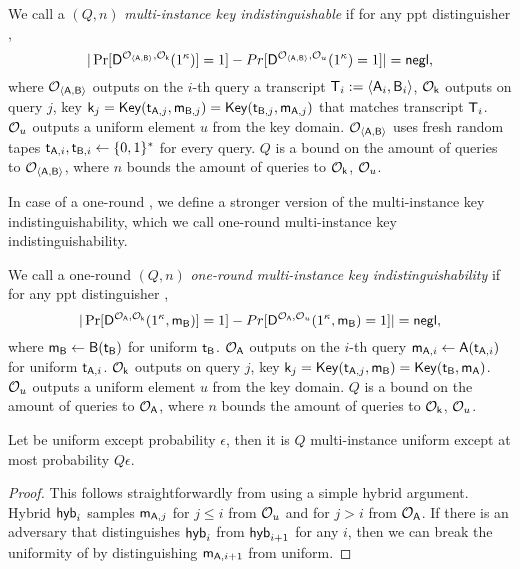 \begin{definition}
We call a \UKA $(Q,n)$ \emph{multi-instance key indistinguishable} if for any ppt distinguisher \D,
$$
|\Pr[\mathsf D^{\mathcal{O}_{\langle \mathsf{A},\mathsf{B}\rangle}, \mathcal{O}_{\mathsf{k}}}(1^{\kappa})]=1]-Pr[\mathsf D^{\mathcal{O}_{\langle \mathsf{A},\mathsf{B}\rangle},\mathcal{O}_{u}}(1^{\kappa})=1]|=\mathsf{negl},
$$
where $\mathcal{O}_{\langle \mathsf{A},\mathsf{B}\rangle}$ outputs on the $i$-th query a transcript $\mathsf{T}_i:=\langle \mathsf{A}_i,\mathsf{B}_i\rangle$, $\mathcal{O}_{\mathsf{k}}$ outputs on query $j$, key $\mathsf{k}_j=\mathsf{Key}(\mathsf{t}_{\mathsf{A},j},\mathsf{m}_{\mathsf{B},j})=\mathsf{Key}(\mathsf{t}_{\mathsf{B},j},\mathsf{m}_{\mathsf{A},j})$ that matches transcript $\mathsf{T}_i$. $\mathcal{O}_u$ outputs a uniform element $u$ from the key domain. $\mathcal{O}_{\langle \mathsf{A},\mathsf{B}\rangle}$ uses fresh random tapes $\mathsf{t}_{\mathsf{A},i},\mathsf{t}_{\mathsf{B},i}\leftarrow\{0,1\}^*$ for every query. $Q$ is a bound on the amount of queries to $\mathcal{O}_{\langle \mathsf{A},\mathsf{B}\rangle}$, where $n$ bounds the amount of queries to $\mathcal{O}_{\mathsf{k}}$, $\mathcal{O}_{u}$. 
\end{definition}

In case of a one-round \UKA, we define a stronger version of the multi-instance key indistinguishability, which we call one-round multi-instance key indistinguishability.

\begin{definition}
We call a one-round \UKA $(Q,n)$ \emph{one-round multi-instance key indistinguishability} if for any ppt distinguisher \D,
$$
|\Pr[\mathsf D^{\mathcal{O}_{\mathsf{A}}, \mathcal{O}_{\mathsf{k}}}(1^{\kappa},\mathsf{m}_\mathsf{B})]=1]-Pr[\mathsf D^{\mathcal{O}_{\mathsf{A}},\mathcal{O}_{u}}(1^{\kappa},\mathsf{m}_\mathsf{B})=1]|=\mathsf{negl},
$$
where $\mathsf{m}_{\mathsf{B}}\leftarrow\mathsf{B}(\mathsf{t}_{\mathsf{B}})$ for uniform $\mathsf{t}_{\mathsf{B}}$. $\mathcal{O}_{\mathsf{A}}$ outputs on the $i$-th query $\mathsf{m}_{\mathsf{A},i}\leftarrow \mathsf{A}(\mathsf{t}_{\mathsf{A},i})$ for uniform $\mathsf{t}_{\mathsf{A},i}$. $\mathcal{O}_{\mathsf{k}}$ outputs on query $j$, key $\mathsf{k}_j=\mathsf{Key}(\mathsf{t}_{\mathsf{A},j},\mathsf{m}_{\mathsf{B}})=\mathsf{Key}(\mathsf{t}_{\mathsf{B}},\mathsf{m}_{\mathsf{A}})$. $\mathcal{O}_u$ outputs a uniform element $u$ from the key domain. $Q$ is a bound on the amount of queries to $\mathcal{O}_{\mathsf{A}}$, where $n$ bounds the amount of queries to $\mathcal{O}_{\mathsf{k}}$, $\mathcal{O}_{u}$. 
\end{definition}

 
\begin{lemma}\label{lem:multuniform}
Let \UKA be uniform except probability $\epsilon$, then it is $Q$ multi-instance uniform except at most probability $Q\epsilon$.
\end{lemma}
\begin{proof}
This follows straightforwardly from using a simple hybrid argument. Hybrid $\mathsf{hyb}_{i}$ samples $\mathsf{m}_{\mathsf{A},j}$ for $j\leq i$ from $\mathcal{O}_u$ and for $j>i$ from $\mathcal{O}_{\mathsf{A}}$. If there is an adversary that distinguishes $\mathsf{hyb}_i$ from $\mathsf{hyb}_{i+1}$ for any $i$, then we can break the uniformity of \UKA by distinguishing $\mathsf{m}_{\mathsf{A},i+1}$ from uniform.  
\end{proof}

